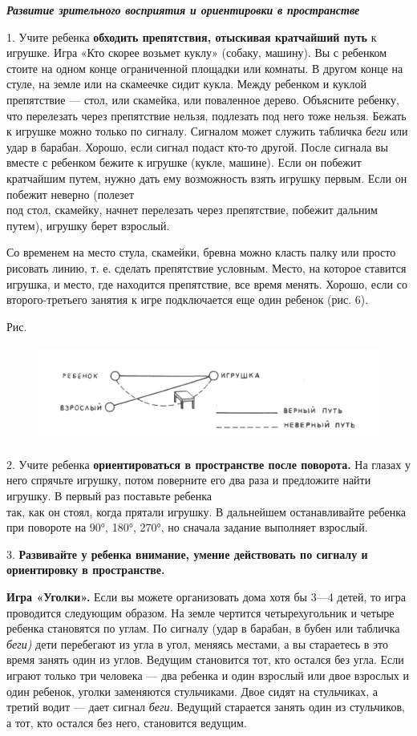 \documentclass[a5paper]{book}
\renewcommand{\emph}[1]{\textit{#1}}
\begin{document}
\emph{\textbf{Развитие зрительного восприятия и ориентировки в
пространстве}}

1. Учите ребенка \textbf{обходить препятствия, отыскивая кратчайший
путь} к игрушке. Игра «Кто скорее возьмет куклу» (собаку, машину). Вы с
ребенком стоите на одном конце ограниченной площадки или комнаты. В
другом конце на стуле, на земле или на скамеечке сидит кукла. Между
ребенком и куклой препятствие --- стол, или скамейка, или поваленное
дерево. Объясните ребенку, что перелезать через препятствие нельзя,
подлезать под него тоже нельзя. Бежать к игрушке можно только по
сигналу. Сигналом может служить табличка \emph{беги} или удар в барабан.
Хорошо, если сигнал подаст кто-то другой. После сигнала вы вместе с
ребенком бежите к игрушке (кукле, машине). Если он побежит кратчайшим
путем, нужно дать ему возможность взять игрушку первым. Если он побежит
неверно (полезет\\
под стол, скамейку, начнет перелезать через препятствие, побежит дальним
путем), игрушку берет взрослый.

Со временем на место стула, скамейки, бревна можно класть палку или
просто рисовать линию, т. е. сделать препятствие условным. Место, на
которое ставится игрушка, и место, где находится препятствие, все время
менять. Хорошо, если со второго-третьего занятия к игре подключается еще
один ребенок (рис. 6).

Рис.
\begin{figure}
\includegraphics[width=4.90972in,height=1.25in]{media/media/image6.jpg}
\end{figure}

2. Учите ребенка \textbf{ориентироваться в пространстве после поворота.}
На глазах у него спрячьте игрушку, потом поверните его два раза и
предложите найти игрушку. В первый раз поставьте ребенка\\
так, как он стоял, когда прятали игрушку. В дальнейшем останавливайте
ребенка при повороте на 90°, 180°, 270°, но сначала задание выполняет
взрослый.

3. \textbf{Развивайте у ребенка внимание, умение действовать по сигналу
и ориентировку в пространстве.}

\textbf{Игра «Уголки».} Если вы можете организовать дома хотя бы 3---4
детей, то игра проводится следующим образом. На земле чертится
четырехугольник и четыре ребенка становятся по углам. По сигналу (удар в
барабан, в бубен или табличка \emph{беги)} дети перебегают из угла в
угол, меняясь местами, а вы стараетесь в это время занять один из углов.
Ведущим становится тот, кто остался без угла. Если играют только три
человека --- два ребенка и один взрослый или двое взрослых и один
ребенок, уголки заменяются стульчиками. Двое сидят на стульчиках, а
третий водит --- дает сигнал \emph{беги.} Ведущий старается занять один
из стульчиков, а тот, кто остался без него, становится ведущим.
\end{document}
